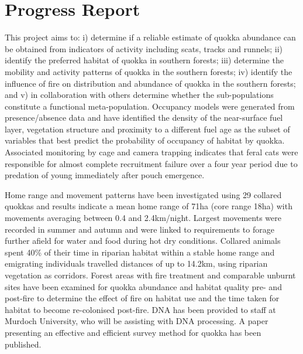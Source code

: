 \documentclass[version=last, paper=a4, DIV=18, usenames, dvipsnames]{scrartcl}
\begin{document}
%

%




\section*{Progress Report}
This project aims to: i) determine if a reliable estimate of quokka
abundance can be obtained from indicators of activity including scats,
tracks and runnels; ii) identify the preferred habitat of quokka in
southern forests; iii) determine the mobility and activity patterns of
quokka in the southern forests; iv) identify the influence of fire on
distribution and abundance of quokka in the southern forests; and v) in
collaboration with others determine whether the sub-populations
constitute a functional meta-population. Occupancy models were generated
from presence/absence data and have identified the density of the
near-surface fuel layer, vegetation structure and proximity to a
different fuel age as the subset of variables that best predict the
probability of occupancy of habitat by quokka. Associated monitoring by
cage and camera trapping indicates that feral cats were responsible for
almost complete recruitment failure over a four year period due to
predation of young immediately after pouch emergence.

Home range and movement patterns have been investigated using 29
collared quokkas and results indicate a mean home range of 71ha (core
range 18ha) with movements averaging between 0.4 and 2.4km/night.
Largest movements were recorded in summer and autumn and were linked to
requirements to forage further afield for water and food during hot dry
conditions. Collared animals spent 40\% of their time in riparian
habitat within a stable home range and emigrating individuals travelled
distances of up to 14.2km, using riparian vegetation as corridors.
Forest areas with fire treatment and comparable unburnt sites have been
examined for quokka abundance and habitat quality pre- and post-fire to
determine the effect of fire on habitat use and the time taken for
habitat to become re-colonised post-fire. DNA has been provided to staff
at Murdoch University, who will be assisting with DNA processing. A
paper presenting an effective and efficient survey method for quokka has
been published.




\clearpage
\end{document}
